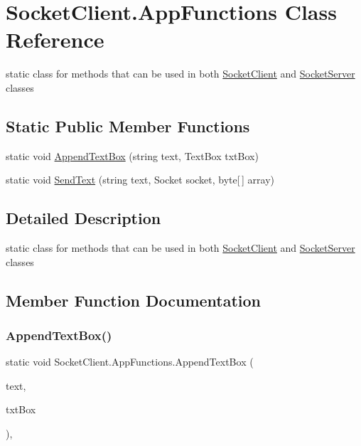\hypertarget{class_socket_client_1_1_app_functions}{}\section{Socket\+Client.\+App\+Functions Class Reference}
\label{class_socket_client_1_1_app_functions}


static class for methods that can be used in both \hyperlink{class_socket_client_1_1_socket_client}{Socket\+Client} and \hyperlink{namespace_socket_server}{Socket\+Server} classes  


\subsection*{Static Public Member Functions}
\begin{DoxyCompactItemize}
\item 
static void \hyperlink{class_socket_client_1_1_app_functions_a94969c8e5b44ab786b93c8eea39634ac}{Append\+Text\+Box} (string text, Text\+Box txt\+Box)
\item 
static void \hyperlink{class_socket_client_1_1_app_functions_a4050a5f5c5779c67f0579bc5ad890cf1}{Send\+Text} (string text, Socket socket, byte\mbox{[}$\,$\mbox{]} array)
\end{DoxyCompactItemize}


\subsection{Detailed Description}
static class for methods that can be used in both \hyperlink{class_socket_client_1_1_socket_client}{Socket\+Client} and \hyperlink{namespace_socket_server}{Socket\+Server} classes 



\subsection{Member Function Documentation}
\mbox{\label{class_socket_client_1_1_app_functions_a94969c8e5b44ab786b93c8eea39634ac}} 
\subsubsection{\texorpdfstring{Append\+Text\+Box()}{AppendTextBox()}}
{\footnotesize\ttfamily static void Socket\+Client.\+App\+Functions.\+Append\+Text\+Box (\begin{DoxyParamCaption}\item[{string}]{text,  }\item[{Text\+Box}]{txt\+Box }\end{DoxyParamCaption})\hspace{0.3cm}{\ttfamily [inline]}, {\ttfamily [static]}}

